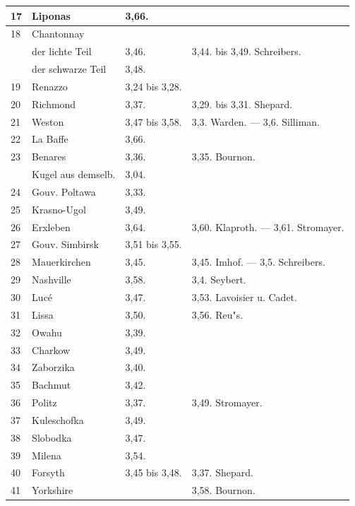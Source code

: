 \documentclass[a4paper, 11pt, oneside, polutonikogreek, german]{article}
\begin{document}
\begin{center}
\begin{longtable}{|p{7mm}|p{32mm}|p{30mm}|p{30mm}|}
        17 & Liponas & 3,66. &   \\ \hline
        18 & Chantonnay &   &   \\ \hline
          & der lichte Teil & 3,46. & 3,44. bis 3,49. Schreibers. \\ \hline
          & der schwarze Teil & 3,48. &   \\ \hline
        19 & Renazzo & 3,24 bis 3,28. &   \\ \hline
        20 & Richmond & 3,37. & 3,29. bis 3,31. Shepard. \\ \hline
        21 & Weston & 3,47 bis 3,58. & 3,3. Warden. --- 3,6. Silliman. \\ \hline
        22 & La Baffe & 3,66. &   \\ \hline
        23 & Benares & 3,36. & 3,35. Bournon. \\ \hline
          & Kugel aus demselb. & 3,04. &   \\ \hline
        24 & Gouv. Poltawa & 3,33. &   \\ \hline
        25 & Krasno-Ugol & 3,49. &   \\ \hline
        26 & Erxleben & 3,64. & 3,60. Klaproth. --- 3,61. Stromayer. \\ \hline
        27 & Gouv. Simbirsk & 3,51 bis 3,55. &   \\ \hline
        28 & Mauerkirchen & 3,45. & 3,45. Imhof. --- 3,5. Schreibers. \\ \hline
        29 & Nashville & 3,58. & 3,4. Seybert. \\ \hline
        30 & Lucé & 3,47. & 3,53. Lavoisier u. Cadet. \\ \hline
        31 & Lissa & 3,50. & 3,56. Reu"s. \\ \hline
        32 & Owahu & 3,39. &   \\ \hline
        33 & Charkow & 3,49. &   \\ \hline
        34 & Zaborzika & 3,40. &   \\ \hline
        35 & Bachmut & 3,42. &   \\ \hline
        36 & Politz & 3,37. & 3,49. Stromayer. \\ \hline
        37 & Kuleschofka & 3,49. &   \\ \hline
        38 & Slobodka & 3,47. &   \\ \hline
        39 & Milena & 3,54. &   \\ \hline
        40 & Forsyth & 3,45 bis 3,48. & 3,37. Shepard. \\ \hline
        41 & Yorkshire &   & 3,58. Bournon. \\ \hline

\end{longtable}
\end{center}
\end{document}
